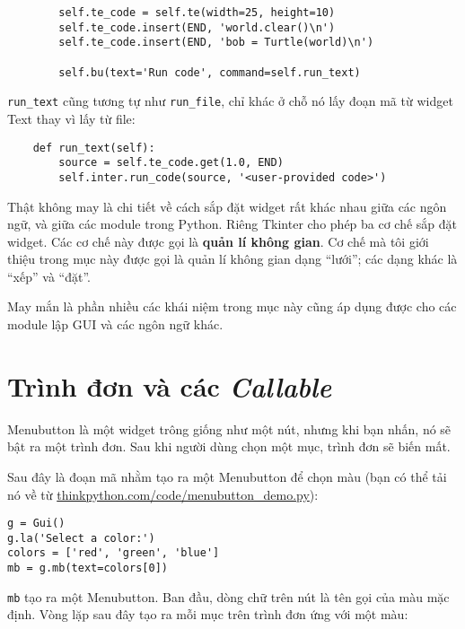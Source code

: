 \documentclass[11pt]{book}
\begin{document}
\beforeverb
\begin{verbatim}
        self.te_code = self.te(width=25, height=10)
        self.te_code.insert(END, 'world.clear()\n')
        self.te_code.insert(END, 'bob = Turtle(world)\n')

        self.bu(text='Run code', command=self.run_text)
\end{verbatim}
\afterverb
%
\verb"run_text" cũng tương tự như \verb"run_file", chỉ khác ở chỗ nó lấy
đoạn mã từ widget Text thay vì lấy từ file:

\beforeverb
\begin{verbatim}
    def run_text(self):
        source = self.te_code.get(1.0, END)
        self.inter.run_code(source, '<user-provided code>')
\end{verbatim}
\afterverb
%
Thật không may là chi tiết về cách sắp đặt widget rất khác nhau
giữa các ngôn ngữ, và giữa các module trong Python.
Riêng Tkinter cho phép ba cơ chế sắp đặt widget. Các cơ chế này
được gọi là {\bf quản lí không gian}.
Cơ chế mà tôi giới thiệu trong mục này được gọi là quản lí không gian
dạng ``lưới''; các dạng khác là ``xếp'' và ``đặt''.


May mắn là phần nhiều các khái niệm trong mục này cũng áp dụng
được cho các module lập GUI và các ngôn ngữ khác.


\section{Trình đơn và các {\em Callable}}


Menubutton là một widget trông giống như một nút, nhưng khi bạn nhấn,
nó sẽ bật ra một trình đơn. Sau khi người dùng chọn một mục, trình đơn
sẽ biến mất.

Sau đây là đoạn mã nhằm tạo ra một Menubutton để chọn màu
(bạn có thể tải nó về từ \url{thinkpython.com/code/menubutton_demo.py}):


\beforeverb
\begin{verbatim}
g = Gui()
g.la('Select a color:')
colors = ['red', 'green', 'blue']
mb = g.mb(text=colors[0])
\end{verbatim}
\afterverb
%
{\tt mb} tạo ra một Menubutton.  Ban đầu, dòng chữ trên nút là tên gọi của
màu mặc định. Vòng lặp sau đây tạo ra mỗi mục trên trình đơn ứng với
một màu:
\end{document}
